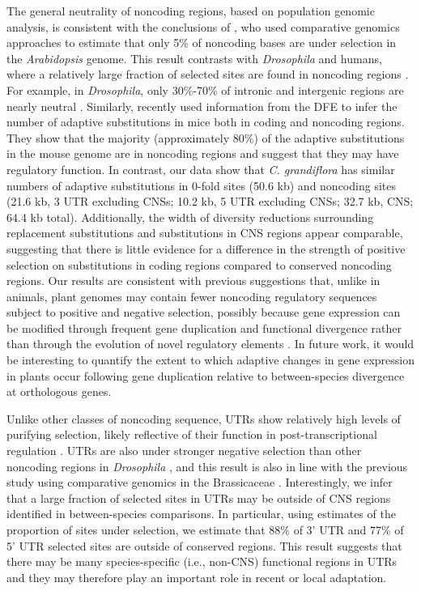 The general neutrality of noncoding regions, based on population genomic analysis, is consistent with the conclusions of \citet{Haudry2013-qe}, who used comparative genomics approaches to estimate that only 5\% of noncoding bases are under selection in the \textit{Arabidopsis} genome. This result contrasts with \textit{Drosophila} and humans, where a relatively large fraction of selected sites are found in noncoding regions \citep{hough2013}. For example, in \textit{Drosophila}, only 30\%-70\% of intronic and intergenic regions are nearly neutral \citep{andolfatto2005, Eyre-Walker2009-zt, sella2009}. Similarly, \citet{Halligan2013} recently used information from the DFE to infer the number of adaptive substitutions in mice both in coding and noncoding regions. They show that the majority (approximately 80\%) of the adaptive substitutions in the mouse genome are in noncoding regions and suggest that they may have regulatory function. In contrast, our data show that \textit{C. grandiflora} has similar numbers of adaptive substitutions in 0-fold sites (50.6 kb) and noncoding sites (21.6 kb, 3\textsc{} UTR excluding CNSs; 10.2 kb, 5\textsc{} UTR excluding CNSs; 32.7 kb, CNS; 64.4 kb total). Additionally, the width of diversity reductions surrounding replacement substitutions and substitutions in CNS regions appear comparable, suggesting that there is little evidence for a difference in the strength of positive selection on substitutions in coding regions compared to conserved noncoding regions. Our results are consistent with previous suggestions that, unlike in animals, plant genomes may contain fewer noncoding regulatory sequences subject to positive and negative selection, possibly because gene expression can be modified through frequent gene duplication and functional divergence rather than through the evolution of novel regulatory elements \citep{lockton2005}. In future work, it would be interesting to quantify the extent to which adaptive changes in gene expression in plants occur following gene duplication relative to between-species divergence at orthologous genes.

Unlike other classes of noncoding sequence, UTRs show relatively high levels of purifying selection, likely reflective of their function in post-transcriptional regulation \citep{kim2014}. UTRs are also under stronger negative selection than other noncoding regions in \textit{Drosophila} \citep{andolfatto2005}, and this result is also in line with the previous study using comparative genomics in the Brassicaceae \citep{Haudry2013-qe}. Interestingly, we infer that a large fraction of selected sites in UTRs may be outside of CNS regions identified in between-species comparisons. In particular, using estimates of the proportion of sites under selection, we estimate that 88\% of 3’ UTR and 77\% of 5’ UTR selected sites are outside of conserved regions.  This result suggests that there may be many species-specific (i.e., non-CNS) functional regions in UTRs and they may therefore play an important role in recent or local adaptation.

